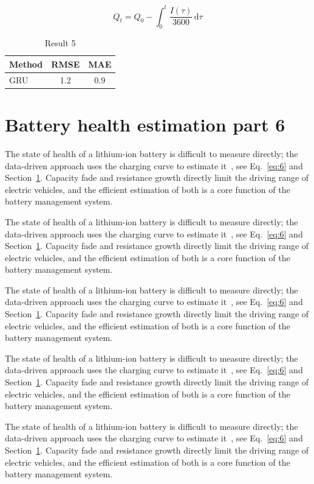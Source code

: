 \documentclass[11pt]{article}
\begin{document}
\begin{equation}\label{eq:5}
  Q_t = Q_0 - \int_0^t \frac{I(\tau)}{3600}\,\mathrm{d}\tau
\end{equation}
\begin{table}[h]\centering\begin{tabular}{lcc}\toprule Method & RMSE & MAE\\\midrule GRU & 1.2 & 0.9\\\bottomrule\end{tabular}\caption{Result 5}\end{table}

\section{Battery health estimation part 6}\label{sec:6}
The state of health of a lithium-ion battery is difficult to measure directly; the data-driven approach uses the charging curve to estimate it~\cite{a2020}, see Eq.~\eqref{eq:6} and Section~\ref{sec:6}. Capacity fade and resistance growth directly limit the driving range of electric vehicles, and the efficient estimation of both is a core function of the battery management system.

The state of health of a lithium-ion battery is difficult to measure directly; the data-driven approach uses the charging curve to estimate it~\cite{a2020}, see Eq.~\eqref{eq:6} and Section~\ref{sec:6}. Capacity fade and resistance growth directly limit the driving range of electric vehicles, and the efficient estimation of both is a core function of the battery management system.

The state of health of a lithium-ion battery is difficult to measure directly; the data-driven approach uses the charging curve to estimate it~\cite{a2020}, see Eq.~\eqref{eq:6} and Section~\ref{sec:6}. Capacity fade and resistance growth directly limit the driving range of electric vehicles, and the efficient estimation of both is a core function of the battery management system.

The state of health of a lithium-ion battery is difficult to measure directly; the data-driven approach uses the charging curve to estimate it~\cite{a2020}, see Eq.~\eqref{eq:6} and Section~\ref{sec:6}. Capacity fade and resistance growth directly limit the driving range of electric vehicles, and the efficient estimation of both is a core function of the battery management system.

The state of health of a lithium-ion battery is difficult to measure directly; the data-driven approach uses the charging curve to estimate it~\cite{a2020}, see Eq.~\eqref{eq:6} and Section~\ref{sec:6}. Capacity fade and resistance growth directly limit the driving range of electric vehicles, and the efficient estimation of both is a core function of the battery management system.
\end{document}
